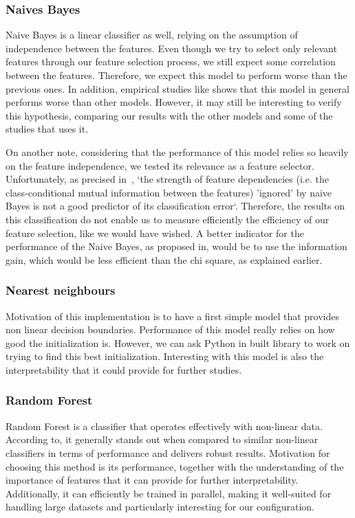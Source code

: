\documentclass{article}
\begin{document}
    \subsubsection{Naives Bayes}
    Naive Bayes is a linear classifier as well, relying on the assumption of independence between the features.
    Even though we try to select only relevant features through our feature selection process, we still expect some correlation between the features.
    Therefore, we expect this model to perform worse than the previous ones.
    In addition, empirical studies like\cite{MLmodelsComparison} shows that this model in general performs worse than other models.
    However, it may still be interesting to verify this hypothesis, comparing our results with the other models and some of the studies that uses it.

    On another note, considering that the performance of this model relies so heavily on the feature independence, we tested its relevance as a feature selector.
    Unfortunately, as precised in~\cite{NaiveBayesBackground}, `the strength of feature dependencies (i.e. the class-conditional mutual information between the features) ’ignored’ by naive Bayes is not a good predictor of its classification error`.
    Therefore, the results on this classification do not enable us to measure efficiently the efficiency of our feature selection, like we would have wished.
    A better indicator for the performance of the Naive Bayes, as proposed in\cite{NaiveBayesBackground}, would be to use the information gain, which would be less efficient than the chi square, as explained earlier.

    \subsubsection{Nearest neighbours}

    Motivation of this implementation is to have a first simple model that provides non linear decision boundaries.
    Performance of this model really relies on how good the initialization is.
    However, we can ask Python in built library to work on trying to find this best initialization.
    Interesting with this model is also the interpretability that it could provide for further studies.

    \subsubsection{Random Forest}
    Random Forest is a classifier that operates effectively with non-linear data.
    According to\cite{MLmodelsComparison}, it generally stands out when compared to similar non-linear classifiers in terms of performance and delivers robust results.
    Motivation for choosing this method is its performance, together with the understanding of the importance of features that it can provide for further interpretability.
    Additionally, it can efficiently be trained in parallel, making it well-suited for handling large datasets and particularly interesting for our configuration.
\end{document}
